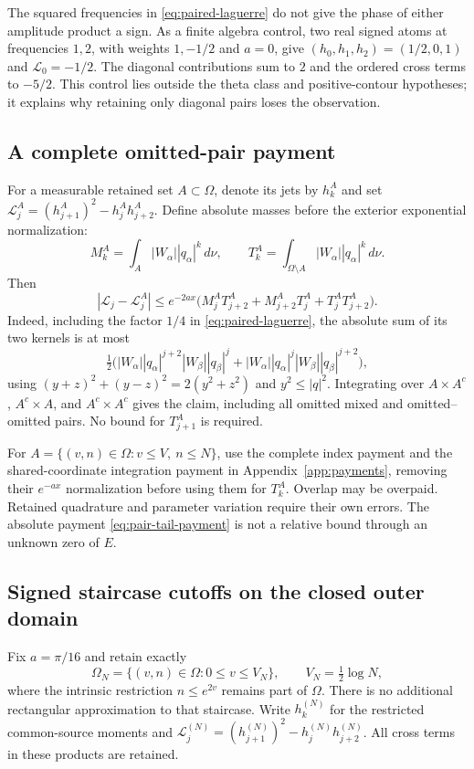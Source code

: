 \documentclass[11pt]{article}
\numberwithin{equation}{section}
\theoremstyle{definition}
\theoremstyle{remark}
\newcommand{\Lag}{\mathcal L}
\begin{document}
The squared frequencies in \eqref{eq:paired-laguerre} do not give the
phase of either amplitude product a sign. As a finite algebra control,
two real signed atoms at frequencies $1,2$, with weights $1,-1/2$
and $a=0$, give $(h_0,h_1,h_2)=(1/2,0,1)$ and $\Lag_0=-1/2$.
The diagonal contributions sum to $2$ and the ordered cross terms to
$-5/2$. This control lies outside the theta class and positive-contour
hypotheses; it explains why retaining only diagonal pairs loses the
observation.

\subsection{A complete omitted-pair payment}
For a measurable retained set $A\subset\Omega$, denote its jets by
$h_k^A$ and set $\Lag_j^A=(h_{j+1}^A)^2-h_j^Ah_{j+2}^A$. Define
absolute masses before the exterior exponential normalization:
\[
 M_k^A=\int_A|W_\alpha||q_\alpha|^k\,d\nu,
 \qquad T_k^A=\int_{\Omega\setminus A}|W_\alpha||q_\alpha|^k\,d\nu.
\]
Then
\begin{equation}
 |\Lag_j-\Lag_j^A|\le e^{-2ax}
 \bigl(M_j^AT_{j+2}^A+M_{j+2}^AT_j^A+T_j^AT_{j+2}^A\bigr).
 \label{eq:pair-tail-payment}
\end{equation}
Indeed, including the factor $1/4$ in \eqref{eq:paired-laguerre},
the absolute sum of its two kernels is at most
\[
 \tfrac12\bigl(|W_\alpha||q_\alpha|^{j+2}
              |W_\beta||q_\beta|^j
       +|W_\alpha||q_\alpha|^j
              |W_\beta||q_\beta|^{j+2}\bigr),
\]
using $(y+z)^2+(y-z)^2=2(y^2+z^2)$ and $y^2\le|q|^2$.
Integrating over $A\times A^c$, $A^c\times A$, and $A^c\times A^c$
gives the claim, including all omitted mixed and omitted--omitted pairs.
No bound for $T_{j+1}^A$ is required.

For $A=\{(v,n)\in\Omega:v\le V,\ n\le N\}$, use the complete
index payment and the shared-coordinate integration payment in
Appendix~\ref{app:payments}, removing their $e^{-ax}$ normalization
before using them for $T_k^A$. Overlap may be overpaid. Retained
quadrature and parameter variation require their own errors. The
absolute payment \eqref{eq:pair-tail-payment} is not a relative bound
through an unknown zero of $E$.

\subsection{Signed staircase cutoffs on the closed outer domain}
Fix $a=\pi/16$ and retain exactly
\begin{equation}
 \Omega_N=\{(v,n)\in\Omega:0\le v\le V_N\},\qquad
 V_N=\tfrac12\log N,
 \label{eq:signed-staircase-domain}
\end{equation}
where the intrinsic restriction $n\le e^{2v}$ remains part of
$\Omega$. There is no additional rectangular approximation to that
staircase. Write $h_k^{(N)}$ for the restricted common-source moments
and $\Lag_j^{(N)}=(h_{j+1}^{(N)})^2-h_j^{(N)}h_{j+2}^{(N)}$.
All cross terms in these products are retained.
\end{document}

